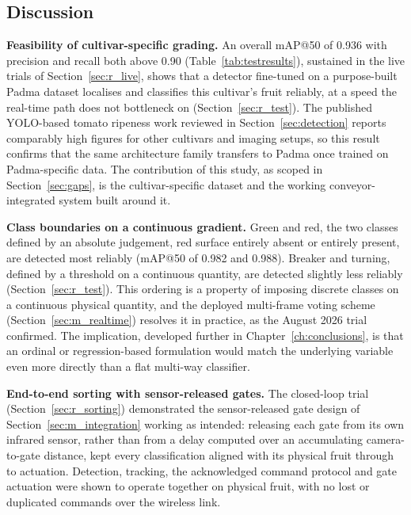 \subsection{Discussion}
\label{sec:r_discussion}

\textbf{Feasibility of cultivar-specific grading.} An overall mAP@50 of 0.936 with precision and recall both above 0.90 (Table~\ref{tab:testresults}), sustained in the live trials of Section~\ref{sec:r_live}, shows that a detector fine-tuned on a purpose-built Padma dataset localises and classifies this cultivar's fruit reliably, at a speed the real-time path does not bottleneck on (Section~\ref{sec:r_test}). The published YOLO-based tomato ripeness work reviewed in Section~\ref{sec:detection} reports comparably high figures for other cultivars and imaging setups, so this result confirms that the same architecture family transfers to Padma once trained on Padma-specific data. The contribution of this study, as scoped in Section~\ref{sec:gaps}, is the cultivar-specific dataset and the working conveyor-integrated system built around it.

\textbf{Class boundaries on a continuous gradient.} Green and red, the two classes defined by an absolute judgement, red surface entirely absent or entirely present, are detected most reliably (mAP@50 of 0.982 and 0.988). Breaker and turning, defined by a threshold on a continuous quantity, are detected slightly less reliably (Section~\ref{sec:r_test}). This ordering is a property of imposing discrete classes on a continuous physical quantity, and the deployed multi-frame voting scheme (Section~\ref{sec:m_realtime}) resolves it in practice, as the August 2026 trial confirmed. The implication, developed further in Chapter~\ref{ch:conclusions}, is that an ordinal or regression-based formulation would match the underlying variable even more directly than a flat multi-way classifier.

\textbf{End-to-end sorting with sensor-released gates.} The closed-loop trial (Section~\ref{sec:r_sorting}) demonstrated the sensor-released gate design of Section~\ref{sec:m_integration} working as intended: releasing each gate from its own infrared sensor, rather than from a delay computed over an accumulating camera-to-gate distance, kept every classification aligned with its physical fruit through to actuation. Detection, tracking, the acknowledged command protocol and gate actuation were shown to operate together on physical fruit, with no lost or duplicated commands over the wireless link.

